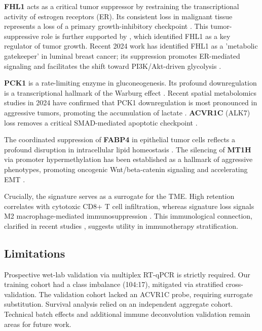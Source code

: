 \documentclass[a4paper,fleqn]{cas-sc}
\begin{document}
\textbf{FHL1} acts as a critical tumor suppressor by restraining the transcriptional activity of estrogen receptors (ER). Its consistent loss in malignant tissue represents a loss of a primary growth-inhibitory checkpoint \citep{xu2013}. This tumor-suppressive role is further supported by \citet{bernardi2006}, which identified FHL1 as a key regulator of tumor growth. Recent 2024 work has identified FHL1 as a 'metabolic gatekeeper' in luminal breast cancer; its suppression promotes ER-mediated signaling and facilitates the shift toward PI3K/Akt-driven glycolysis \citep{qin2024, gremke2024}.

\textbf{PCK1} is a rate-limiting enzyme in gluconeogenesis. Its profound downregulation is a transcriptional hallmark of the Warburg effect \citep{ma2013}. Recent spatial metabolomics studies in 2024 have confirmed that PCK1 downregulation is most pronounced in aggressive tumors, promoting the accumulation of lactate \citep{zhang2024a, fang2024, chen2023}. \textbf{ACVR1C} (ALK7) loss removes a critical SMAD-mediated apoptotic checkpoint \citep{zeng2013}.

The coordinated suppression of \textbf{FABP4} in epithelial tumor cells reflects a profound disruption in intracellular lipid homeostasis \citep{luofabp2020, wang2023}. The silencing of \textbf{MT1H} via promoter hypermethylation has been established as a hallmark of aggressive phenotypes, promoting oncogenic Wnt/beta-catenin signaling and accelerating EMT \citep{cheng2016, gu2024, wang2024b}.

Crucially, the signature serves as a surrogate for the TME. High retention correlates with cytotoxic CD8+ T cell infiltration, whereas signature loss signals M2 macrophage-mediated immunosuppression \citep{denkert2018}. This immunological connection, clarified in recent studies \citep{zhang2024b, alzoughbi2024, li2024, huang2024}, suggests utility in immunotherapy stratification.

\subsection{Limitations}
Prospective wet-lab validation via multiplex RT-qPCR is strictly required. Our training cohort had a class imbalance (104:17), mitigated via stratified cross-validation. The validation cohort lacked an ACVR1C probe, requiring surrogate substitution. Survival analysis relied on an independent aggregate cohort. Technical batch effects and additional immune deconvolution validation remain areas for future work.
\end{document}
